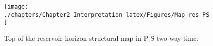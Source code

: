 \begin{figure}[hbtp]
	\begin{center}
	\texttt{[image: ./chapters/Chapter2\_Interpretation\_latex/Figures/Map\_res\_PS]}
			\caption[Top of the reservoir horizon structural map in P-S two-way-time.]{Top of the reservoir horizon structural map in P-S two-way-time.}
			\label{fig:Map_res_PS_time}
		\end{center}
	\end{figure}
   
